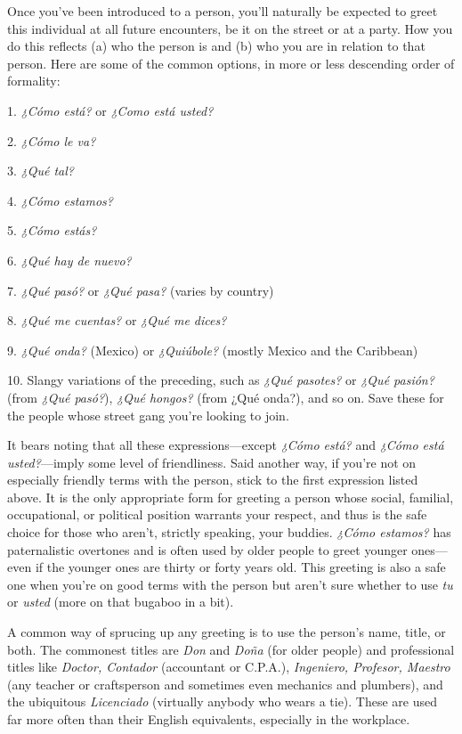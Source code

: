 Once you've been introduced to a person, you'll naturally be
expected to greet this individual at all future encounters, be it on the
street or at a party. How you do this reflects (a) who the person is and
(b) who you are in relation to that person. Here are some of the common options, in more or less descending order of formality:

\bsk

1. \emph{¿Cómo está?} or \emph{¿Como está usted?}

2. \emph{¿Cómo le va?}

3. \emph{¿Qué tal?}

4. \emph{¿Cómo estamos?}

5. \emph{¿Cómo estás?}

6. \emph{¿Qué hay de nuevo?}

7. \emph{¿Qué pasó?} or \emph{¿Qué pasa?} (varies by country)

8. \emph{¿Qué me cuentas?} or \emph{¿Qué me dices?}

9. \emph{¿Qué onda?} (Mexico) or \emph{¿Quiúbole?} (mostly Mexico and
the Caribbean)

10. Slangy variations of the preceding, such as \emph{¿Qué pasotes?}
or \emph{¿Qué pasión?} (from \emph{¿Qué pasó?}), \emph{¿Qué hongos?} (from ¿Qué onda?),
and so on. Save these for the people whose street gang you're looking
to join.

\bsk

It bears noting that all these expressions---except \emph{¿Cómo está?}
and \emph{¿Cómo está usted?}---imply some level of friendliness. Said another way, if you're not on especially friendly terms with the person,
stick to the first expression listed above. It is the only appropriate
form for greeting a person whose social, familial, occupational, or political position warrants your respect, and thus is the safe choice for
those who aren't, strictly speaking, your buddies. \emph{¿Cómo estamos?} has
paternalistic overtones and is often used by older people to greet
younger ones---even if the younger ones are thirty or forty years old.
This greeting is also a safe one when you're on good terms with the
person but aren't sure whether to use \emph{tu} or \emph{usted} (more on that bugaboo in a bit).

A common way of sprucing up any greeting is to use the person's name, title, or both. The commonest titles are \emph{Don} and \emph{Doña}
(for older people) and professional titles like \emph{Doctor, Contador} (accountant or C.P.A.), \emph{Ingeniero, Profesor, Maestro} (any teacher or craftsperson and sometimes even mechanics and plumbers), and the ubiquitous \emph{Licenciado} (virtually anybody who wears a tie). These are used far
more often than their English equivalents, especially in the workplace.

